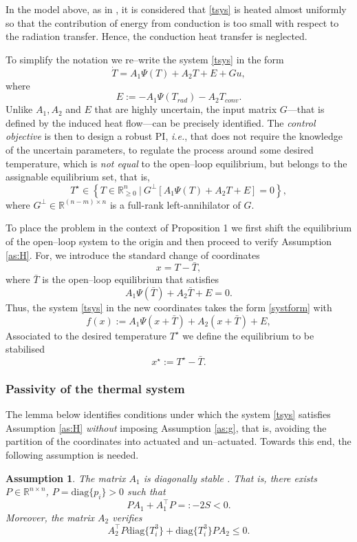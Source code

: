 \documentclass[10pt, conference]{ieeeconf}
\newtheorem{assumption}{Assumption}
\def\rea{\mathbb{R}}
\def\diag{\mbox{diag}}
\def\begequ{\begin{equation}}
\def\endequ{\end{equation}}
\def\lab{\label}
\begin{document}
In the model above, as in \cite{schaper1992modeling}, it is considered that  \eqref{tsys}  is heated almost uniformly so that the contribution of energy from conduction is too small with respect to the radiation transfer. Hence, the conduction heat transfer is neglected. 

To simplify the notation we re--write the system \eqref{tsys} in the form 
$$
\dot{T} = A_1 \Psi(T)+A_2 T+E +Gu,
$$
where
$$
E:= -  A_1 \Psi(T_{rad}) - A_2 T_{conv}. 
$$
Unlike  $A_1,A_2$ and $E$ that are highly uncertain, the input matrix $G$---that is defined by the induced heat flow---can be precisely identified. The {\em control objective} is then to design a robust PI, {\em i.e.}, that does not require the knowledge of  the uncertain parameters, to regulate the process around some desired temperature, which is {\em not equal} to the open--loop equilibrium, but belongs to the assignable equilibrium set, that is,
\begequ
\lab{tsta}
T^\star \in \left\{T \in \rea^n_{\geq 0}\ |\ G^\perp [A_1 \Psi(T)+A_2 T + E] = 0 \right\},
\endequ
where $G^\perp \in \rea^{(n-m) \times n}$ is a full-rank left-annihilator of $G$.

To place the problem in the context of Proposition 1 we first shift the equilibrium of the open--loop system to the origin and then proceed to verify Assumption \ref{as:H}. For, we  introduce the standard change of coordinates
$$
x=T-\bar T,
$$
where $\bar T$ is the open--loop equilibrium that satisfies
\begequ
\lab{opelooequ}
A_1 \Psi(\bar T)+A_2 \bar T+E=0.
\endequ
Thus, the system \eqref{tsys} in the new coordinates takes the form \eqref{systform} with
\begin{equation}
\label{vecfie}
	f(x):=  A_1 \Psi(x+\bar T)+A_2(x+\bar T)+E,
\end{equation}
Associated to the desired temperature $T^\star$ we define the equilibrium to be stabilised
\begequ
\lab{xsta}
x^\star := T^\star - \bar T.
\endequ
\subsubsection{Passivity of the thermal system}


The lemma below identifies conditions under which the system  \eqref{tsys} satisfies Assumption \ref{as:H} {\em without} imposing Assumption \ref{as:g}, that is, avoiding the partition of the coordinates into actuated and un--actuated. Towards this end, the following assumption is needed.

\begin{assumption}
\lab{ass4}
The matrix $A_1$ is {\em diagonally stable} \cite{KASBHA}. That is, there exists $P \in \rea^{n \times n}$, $P=\diag\{p_i\}>0$ such that
\begin{equation} \label{eq:lmi}
PA_1+A_1^\top P =:-2S < 0.
\end{equation}
Moreover, the matrix $A_2$ verifies
\begequ
\lab{moncon}
A_2^\top P \diag\{T_i^3\}+  \diag\{T_i^3\} P A_2  \leq 0.
\endequ
\end{assumption}
\vspace{0.2cm}
\end{document}
